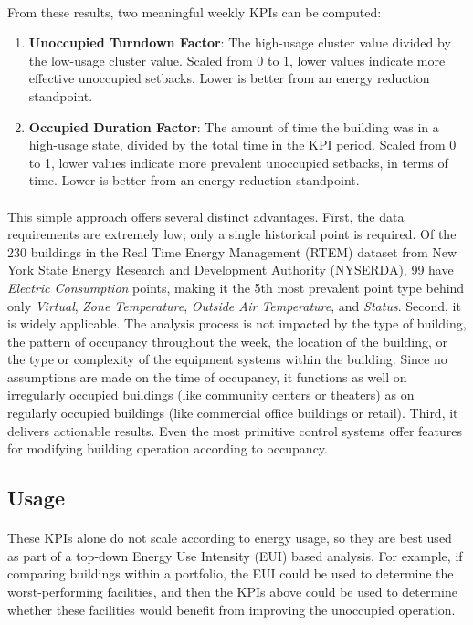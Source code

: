 \documentclass[a4paper]{article}
\begin{document}
\paragraph{}
From these results, two meaningful weekly KPIs can be computed:
\begin{enumerate}
\item{\textbf{Unoccupied Turndown Factor}: The high-usage cluster value divided by the low-usage cluster value. Scaled from 0 to 1, lower values indicate more effective unoccupied setbacks. Lower is better from an energy reduction standpoint.}
\item{\textbf{Occupied Duration Factor}: The amount of time the building was in a high-usage state, divided by the total time in the KPI period. Scaled from 0 to 1, lower values indicate more prevalent unoccupied setbacks, in terms of time.  Lower is better from an energy reduction standpoint.}
\end{enumerate}

\paragraph{}
This simple approach offers several distinct advantages. First, the data requirements are extremely low; only a single historical point is required. Of the 230 buildings in the Real Time Energy Management (RTEM) dataset from New York State Energy Research and Development Authority (NYSERDA), 99 have \textit{Electric Consumption} points, making it the 5th most prevalent point type behind only  \textit{Virtual}, \textit{Zone Temperature}, \textit{Outside Air Temperature}, and \textit{Status}. Second, it is widely applicable. The analysis process is not impacted by the type of building, the pattern of occupancy throughout the week, the location of the building, or the type or complexity of the equipment systems within the building. Since no assumptions are made on the time of occupancy, it functions as well on irregularly occupied buildings (like community centers or theaters) as on regularly occupied buildings (like commercial office buildings or retail). Third, it delivers actionable results. Even the most primitive control systems offer features for modifying building operation according to occupancy.

\subsection{Usage}

\paragraph{}
These KPIs alone do not scale according to energy usage, so they are best used as part of a top-down Energy Use Intensity (EUI) based analysis. For example, if comparing buildings within a portfolio, the EUI could be used to determine the worst-performing facilities, and then the KPIs above could be used to determine whether these facilities would benefit from improving the unoccupied operation.
\end{document}
